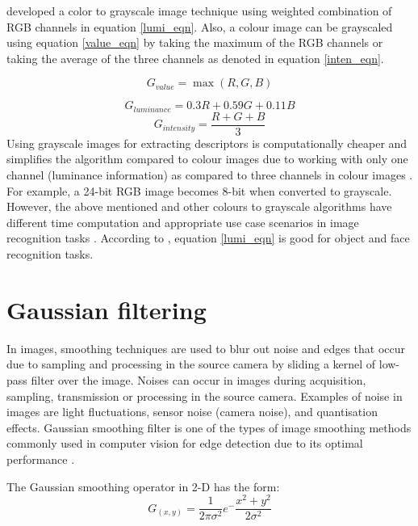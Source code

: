 \cite{pratt2007digital} developed a color to grayscale image technique using weighted combination of RGB channels in equation \ref{lumi_eqn}. Also, a colour image can be grayscaled using equation \ref{value_eqn} by taking the maximum of the RGB channels \cite{acharya2005image} or taking the average of the three channels \cite{jack2007ntsc} as denoted in equation \ref{inten_eqn}.

\begin{equation} \label{value_eqn}
G_{value} = \max (R,G,B)
\end{equation}

\begin{equation} \label{lumi_eqn}
G_{luminance} = 0.3R + 0.59G + 0.11B
\end{equation}
\begin{equation} \label{inten_eqn}
G_{intensity} = \frac{R +G+B}{3}
\end{equation}
Using grayscale images for extracting descriptors is computationally cheaper and simplifies the algorithm compared to colour images due to working with only one channel (luminance information) as compared to three channels in colour images \cite{kanan2012color}. For example, a 24-bit RGB image becomes 8-bit when converted to grayscale. However, the above mentioned and other colours to grayscale algorithms have different time computation and appropriate use case scenarios in image recognition tasks \cite{cadik2008perceptual}. According to \cite*{kanan2012color}, equation \ref{lumi_eqn} is good for object and face recognition tasks.


\section{Gaussian filtering}

In images, smoothing techniques are used to blur out noise and edges that occur due to sampling and processing in the source camera by sliding a kernel of low-pass filter over the image. Noises can occur in images during acquisition, sampling, transmission or processing in the source camera. Examples of noise in images are light fluctuations, sensor noise (camera noise), and quantisation effects. Gaussian smoothing filter is one of the types of image smoothing methods commonly used in computer vision for edge detection due to its optimal performance \cite{basu2002gaussian}.


The Gaussian smoothing operator in 2-D has the form:
\begin{equation} \label{gauss_eqn}
G_{(x,y)} = \frac{1}{2 \pi \sigma^2}e^-{\frac{x^2+y^2}{2\sigma^2}}
\end{equation}
 
